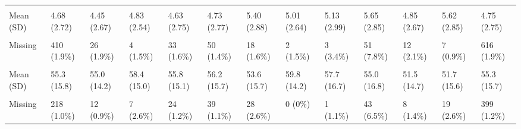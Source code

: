 \documentclass[
  single column]{article}
\begin{document}
\begin{landscape}
\begin{longtable}[t]{lllllllllllll}
\cellcolor{gray!10}{New Zealand Depression Index 2018} & \cellcolor{gray!10}{} & \cellcolor{gray!10}{} & \cellcolor{gray!10}{} & \cellcolor{gray!10}{} & \cellcolor{gray!10}{} & \cellcolor{gray!10}{} & \cellcolor{gray!10}{} & \cellcolor{gray!10}{} & \cellcolor{gray!10}{} & \cellcolor{gray!10}{} & \cellcolor{gray!10}{} & \cellcolor{gray!10}{}\\
Mean (SD) & 4.68 (2.72) & 4.45 (2.67) & 4.83 (2.54) & 4.63 (2.75) & 4.73 (2.77) & 5.40 (2.88) & 5.01 (2.64) & 5.13 (2.99) & 5.65 (2.85) & 4.85 (2.67) & 5.62 (2.85) & 4.75 (2.75)\\
\cellcolor{gray!10}{Median [Min, Max]} & \cellcolor{gray!10}{4.00 [1.00, 10.0]} & \cellcolor{gray!10}{4.00 [1.00, 10.0]} & \cellcolor{gray!10}{5.00 [1.00, 10.0]} & \cellcolor{gray!10}{4.00 [1.00, 10.0]} & \cellcolor{gray!10}{4.00 [1.00, 10.0]} & \cellcolor{gray!10}{5.00 [1.00, 10.0]} & \cellcolor{gray!10}{5.00 [1.00, 10.0]} & \cellcolor{gray!10}{5.00 [1.00, 10.0]} & \cellcolor{gray!10}{6.00 [1.00, 10.0]} & \cellcolor{gray!10}{5.00 [1.00, 10.0]} & \cellcolor{gray!10}{6.00 [1.00, 10.0]} & \cellcolor{gray!10}{4.00 [1.00, 10.0]}\\
\addlinespace
Missing & 410 (1.9\%) & 26 (1.9\%) & 4 (1.5\%) & 33 (1.6\%) & 50 (1.4\%) & 18 (1.6\%) & 2 (1.5\%) & 3 (3.4\%) & 51 (7.8\%) & 12 (2.1\%) & 7 (0.9\%) & 616 (1.9\%)\\
\cellcolor{gray!10}{New Zealand Socio-Economic Index 2018 (Level)} & \cellcolor{gray!10}{} & \cellcolor{gray!10}{} & \cellcolor{gray!10}{} & \cellcolor{gray!10}{} & \cellcolor{gray!10}{} & \cellcolor{gray!10}{} & \cellcolor{gray!10}{} & \cellcolor{gray!10}{} & \cellcolor{gray!10}{} & \cellcolor{gray!10}{} & \cellcolor{gray!10}{} & \cellcolor{gray!10}{}\\
Mean (SD) & 55.3 (15.8) & 55.0 (14.2) & 58.4 (15.0) & 55.8 (15.1) & 56.2 (15.7) & 53.6 (15.7) & 59.8 (14.2) & 57.7 (16.7) & 55.0 (16.8) & 51.5 (14.7) & 51.7 (15.6) & 55.3 (15.7)\\
\cellcolor{gray!10}{Median [Min, Max]} & \cellcolor{gray!10}{59.0 [10.0, 90.0]} & \cellcolor{gray!10}{56.0 [12.0, 90.0]} & \cellcolor{gray!10}{60.0 [18.0, 90.0]} & \cellcolor{gray!10}{59.0 [10.0, 90.0]} & \cellcolor{gray!10}{60.0 [10.0, 90.0]} & \cellcolor{gray!10}{52.0 [10.0, 90.0]} & \cellcolor{gray!10}{63.0 [24.0, 90.0]} & \cellcolor{gray!10}{62.5 [11.0, 90.0]} & \cellcolor{gray!10}{60.0 [11.0, 90.0]} & \cellcolor{gray!10}{48.0 [10.0, 90.0]} & \cellcolor{gray!10}{51.0 [11.0, 90.0]} & \cellcolor{gray!10}{59.0 [10.0, 90.0]}\\
Missing & 218 (1.0\%) & 12 (0.9\%) & 7 (2.6\%) & 24 (1.2\%) & 39 (1.1\%) & 28 (2.6\%) & 0 (0\%) & 1 (1.1\%) & 43 (6.5\%) & 8 (1.4\%) & 19 (2.6\%) & 399 (1.2\%)\\

\end{longtable}
\end{landscape}
\end{document}
